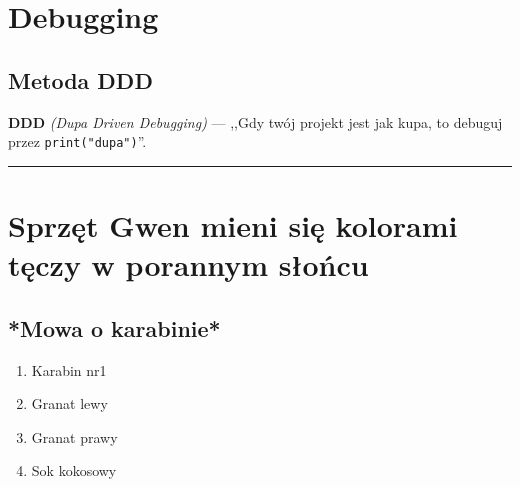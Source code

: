 \chapter{Debugging}
\section{Metoda DDD}

\textbf{DDD} \textsl{(Dupa Driven Debugging)} --- ,,Gdy twój projekt jest jak kupa, to debuguj przez \verb|print("dupa")|''.

\hrule

\chapter{Sprzęt Gwen mieni się kolorami tęczy w porannym słońcu}
\section{*Mowa o karabinie*}

\begin{enumerate}
    \item Karabin nr1
    \item Granat lewy
    \item Granat prawy
    \item Sok kokosowy
\end{enumerate}
